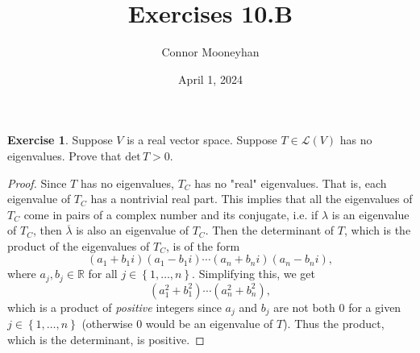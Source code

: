 \documentclass{article}
\title{Exercises 10.B}
\author{Connor Mooneyhan}
\date{April 1, 2024}
\theoremstyle{definition}
\newtheorem{ex}{Exercise}
\begin{document}
\maketitle

\begin{ex}
	Suppose $V$ is a real vector space.
	Suppose $T \in \mathcal{L}(V)$ has no eigenvalues.
	Prove that $\mathrm{det}\,T > 0$.
\end{ex}
\begin{proof}
	Since $T$ has no eigenvalues, $T_C$ has no "real" eigenvalues.
	That is, each eigenvalue of $T_C$ has a nontrivial real part.
	This implies that all the eigenvalues of $T_C$ come in pairs of a complex number and its conjugate, i.e. if $\lambda$ is an eigenvalue of $T_C$, then $\overline{\lambda}$ is also an eigenvalue of $T_C$.
	Then the determinant of $T$, which is the product of the eigenvalues of $T_C$, is of the form \begin{equation*}
		(a_1 + b_1i)(a_1 - b_1i) \cdots (a_n + b_ni)(a_n - b_ni),
	\end{equation*}
	where $a_j, b_j \in \mathbb{R}$ for all $j \in \left\lbrace 1, \dots, n \right\rbrace$.
	Simplifying this, we get \begin{equation*}
		(a_1^2 + b_1^2)\cdots(a_n^2 + b_n^2),
	\end{equation*}
	which is a product of \textit{positive} integers since $a_j$ and $b_j$ are not both 0 for a given $j \in \left\lbrace 1, \dots, n \right\rbrace$ (otherwise 0 would be an eigenvalue of $T$).
	Thus the product, which is the determinant, is positive.
\end{proof}
\end{document}
